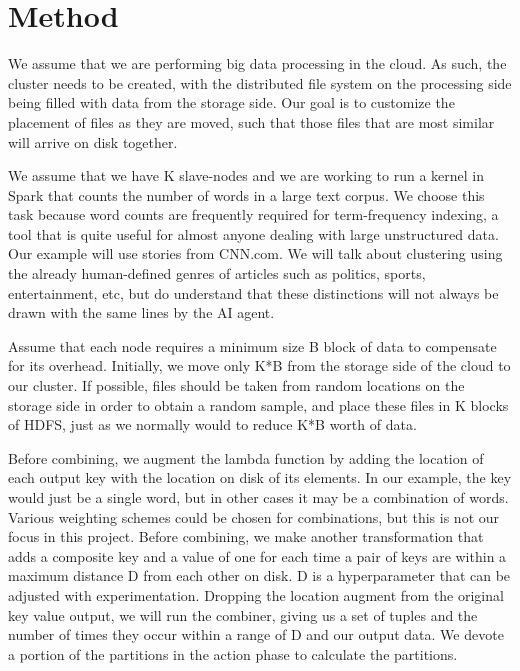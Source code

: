 \documentclass[12pt]{extarticle}
\begin{document}
\section{Method}
We assume that we are performing big data processing in the cloud.  As such, the cluster needs to be created, with the distributed file system on the processing side being filled with data from the storage side.  Our goal is to customize the placement of files as they are moved, such that those files that are most similar will arrive on disk together.  

We assume that we have K slave-nodes and we are working to run a kernel in Spark that counts the number of words in a large text corpus.  We choose this task because word counts are frequently required for term-frequency indexing, a tool that is quite useful for almost anyone dealing with large unstructured data.  Our example will use stories from CNN.com.  We will talk about clustering using the already human-defined genres of articles such as politics, sports, entertainment, etc, but do understand that these distinctions will not always be drawn with the same lines by the AI agent. 

Assume that each node requires a minimum size B block of data to compensate for its overhead.  Initially, we move only K*B from the storage side of the cloud to our cluster.  If possible, files should be taken from random locations on the storage side in order to obtain a random sample, and place these files in K blocks of HDFS, just as we normally would to reduce K*B worth of data.  

Before combining, we augment the lambda function by adding the location of each output key with the location on disk of its elements.  In our example, the key would just be a single word, but in other cases it may be a combination of words.  Various weighting schemes could be chosen for combinations, but this is not our focus in this project.  Before combining, we make another transformation that adds a composite key and a value of one for each time a pair of keys are within a maximum distance D from each other on disk.  D is a hyperparameter that can be adjusted with experimentation.  Dropping the location augment from the original key value output, we will run the combiner, giving us a set of tuples and the number of times they occur within a range of D and our output data.  We devote a portion of the partitions in the action phase to calculate the partitions.   %
\end{document}
